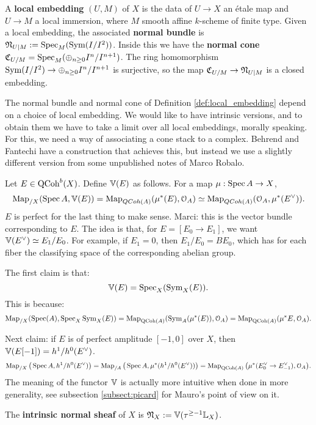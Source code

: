 \begin{defin}
\label{def:local_embedding}
A \textbf{local embedding} $(U,M)$ of $X$ is the data of $U\to X$ an \'etale map and $U\to M$ a local immersion, 
where $M$ smooth affine $k$-scheme of finite type.
Given a local embedding, the associated \textbf{normal bundle} is $\mathfrak N_{U|M} := \operatorname{Spec}_M(\operatorname{Sym} (I/I^2))$. Inside this 
we have the \textbf{normal cone} $\mathfrak C_{U/M} = \operatorname{Spec}_M(\oplus_{n\geq 0} I^n/I^{n+1})$.
The ring homomorphism $\operatorname{Sym} (I/I^2) \to \oplus_{n\geq 0} I^n/I^{n+1}$ is surjective, so the map
$\mathfrak C_{U/M}	\to \mathfrak N_{U|M}$ is a closed embedding.
\end{defin}

The normal bundle and normal cone of Definition \ref{def:local_embedding} depend on a choice of local embedding. We would like
to have intrinsic versions, and to obtain them we have to take a limit over all local embeddings, morally speaking.
For this, we need a way of associating a cone stack to a complex. Behrend and Fantechi have a construction that achieves this,
but instead we use a slightly different version from
some unpublished notes of Marco Robalo. 

Let $E \in \mathrm{QCoh}^b(X)$. Define $\mathbb V(E)$ as follows. For a map $\mu:\operatorname{Spec} A \to X$,
\[	\operatorname{Map}_{/X}(\operatorname{Spec} A, \mathbb V(E)) = \operatorname{Map}_{QCoh(A)}(\mu^*(E), \mathcal{O}_A) \simeq \operatorname{Map}_{QCoh(A)}(\mathcal{O}_A,\mu^*(E^{\vee})).	\]
$E$ is perfect for the last thing to make sense. Marci: this is the vector bundle corresponding to $E$. The idea is that,
for $E = [E_0 \to E_1]$, we want $\mathbb V(E^{\vee}) \simeq E_1/E_0$. For example, if $E_1 = 0$, then $E_1/E_0 = BE_0$, which has for each
fiber the classifying space of the corresponding abelian group.

The first claim is that:
\[	\mathbb V(E) = \operatorname{Spec}_X(\operatorname{Sym}_X(E)) .	\]
This is because:
\[	\operatorname{Map}_{/X}(\operatorname{Spec}(A), \operatorname{Spec}_X \operatorname{Sym}_X(E)) = \operatorname{Map}_{\mathrm{QCoh}(A)}(\operatorname{Sym}_A(\mu^*(E)), \mathcal{O}_A)	= \operatorname{Map}_{\mathrm{QCoh}(A)} (\mu^*E,\mathcal{O}_A).\]

Next claim: if $E$ is of perfect amplitude $[-1,0]$ over $X$, then $\mathbb V(E[-1]) = h^1/h^0(E^{\vee})$.
\[	\operatorname{Map}_{/X}\big(\operatorname{Spec} A, h^1/h^0(E^{\vee})\big) = \operatorname{Map}_{/A}\big(\operatorname{Spec} A, \mu^*(h^1/h^0(E^{\vee}))\big)
= \operatorname{Map}_{\mathrm{QCoh}(A)}\big(\mu^*(E_0^{\vee}\to E_{-1}^{\vee}) , \mathcal{O}_A\big).	\]
The meaning of the functor $\mathbb V$ is actually more intuitive when done in more generality, see subsection \ref{subsect:picard}
for Mauro's point of view on it.

\begin{defin}
The \textbf{intrinsic normal sheaf} of $X$ is $\mathfrak N_X := \mathbb V(\tau^{\geq -1} \mathbb L_X)$.
\end{defin}

